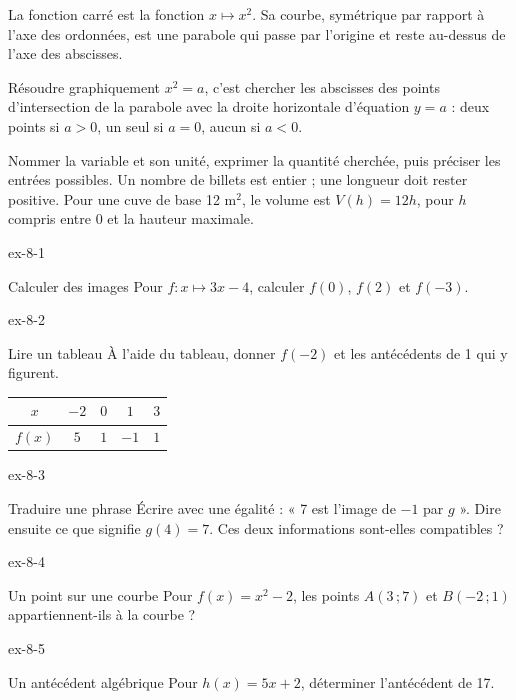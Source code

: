 \begin{definition}La fonction carré est la fonction $x\mapsto x^2$. Sa courbe, symétrique par rapport à l’axe des ordonnées, est une parabole qui passe par l’origine et reste au-dessus de l’axe des abscisses.\end{definition}
\begin{propriete}Résoudre graphiquement $x^2=a$, c’est chercher les abscisses des points d’intersection de la parabole avec la droite horizontale d’équation $y=a$ : deux points si $a>0$, un seul si $a=0$, aucun si $a<0$.\end{propriete}
\begin{savoirfaire}[Modéliser]Nommer la variable et son unité, exprimer la quantité cherchée, puis préciser les entrées possibles. Un nombre de billets est entier ; une longueur doit rester positive. Pour une cuve de base 12 m$^2$, le volume est $V(h)=12h$, pour $h$ compris entre 0 et la hauteur maximale.\end{savoirfaire}
\clearpage{}
\begin{blocLivre}{ex-8-1}\begin{exercice}[1]{Calculer des images}
Pour $f:x\mapsto3x-4$, calculer $f(0)$, $f(2)$ et $f(-3)$.
\end{exercice}\end{blocLivre}
\begin{blocLivre}{ex-8-2}\begin{exercice}[1]{Lire un tableau}
À l’aide du tableau, donner $f(-2)$ et les antécédents de 1 qui y figurent.\begin{center}\renewcommand{\arraystretch}{1.35}\begin{tabular}{c|cccc}\toprule
$x$ & $-2$ & $0$ & $1$ & $3$\\\midrule
$f(x)$ & $5$ & $1$ & $-1$ & $1$\\
\bottomrule\end{tabular}\end{center}
\end{exercice}\end{blocLivre}
\begin{blocLivre}{ex-8-3}\begin{exercice}[1]{Traduire une phrase}
Écrire avec une égalité : « 7 est l’image de $-1$ par $g$ ». Dire ensuite ce que signifie $g(4)=7$. Ces deux informations sont-elles compatibles ?
\end{exercice}\end{blocLivre}
\begin{blocLivre}{ex-8-4}\begin{exercice}[1]{Un point sur une courbe}
Pour $f(x)=x^2-2$, les points $A(3\,;7)$ et $B(-2\,;1)$ appartiennent-ils à la courbe ?
\end{exercice}\end{blocLivre}
\begin{blocLivre}{ex-8-5}\begin{exercice}[1]{Un antécédent algébrique}
Pour $h(x)=5x+2$, déterminer l’antécédent de 17.
\end{exercice}\end{blocLivre}

